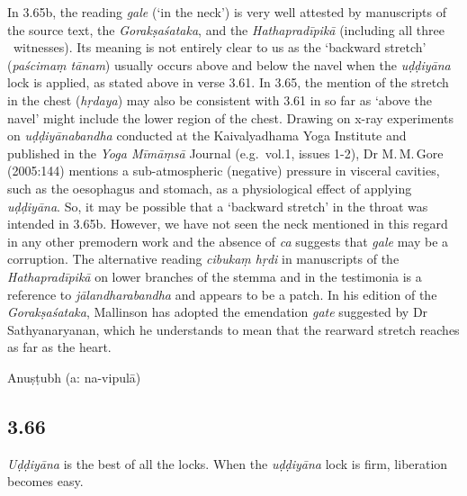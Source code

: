\begin{ekdosis}
\begin{philcomm}[hp03_065]
In 3.65b, the reading \emph{gale} (`in the neck') is very well attested by manuscripts of the source text, the \emph{Gorakṣaśataka}, and the \emph{Hathapradīpikā} (including all three \textalpha\ witnesses). Its meaning is not entirely clear to us as the `backward stretch' (\emph{paścimaṃ tānam}) usually occurs above and below the navel when the \emph{uḍḍiyāna} lock is applied, as stated above in verse 3.61. In 3.65, the mention of the stretch in the chest (\emph{hṛdaya}) may also be consistent with 3.61 in so far as `above the navel' might include the lower region of the chest. Drawing on x-ray experiments on \emph{uḍḍiyānabandha} conducted at the Kaivalyadhama Yoga Institute and published in the \emph{Yoga Mīmāṃsā} Journal (e.g.~vol.1, issues 1-2), Dr M.\,M.\,Gore (2005:144) mentions a sub-atmospheric (negative) pressure in visceral cavities, such as the oesophagus and stomach, as a physiological effect of applying \emph{uḍḍiyāna}. So, it may be possible that a `backward stretch' in the throat was intended in 3.65b. However, we have not seen the neck mentioned in this regard in any other premodern work and the absence of \emph{ca} suggests that \emph{gale} may be a corruption. %
The alternative reading \emph{cibukaṃ hṛdi} in manuscripts of the \emph{Hathapradīpikā} on lower branches of the stemma and in the testimonia is a reference to \emph{jālandharabandha} and appears to be a patch. In his edition of the \emph{Gorakṣaśataka}, Mallinson has adopted the emendation \emph{gate} suggested by Dr Sathyanaryanan, which he understands to mean that the rearward stretch reaches as far as the heart. 
\end{philcomm}
\begin{metre}[hp03_065]
Anuṣṭubh (a: na-vipulā)
\end{metre}

\subsection*{3.66}
\begin{translation}[hp03_066]
\emph{Uḍḍiyāna} is the best of all the locks. When the \emph{uḍḍiyāna} lock is firm, liberation becomes easy.
\end{translation}


\end{ekdosis}
